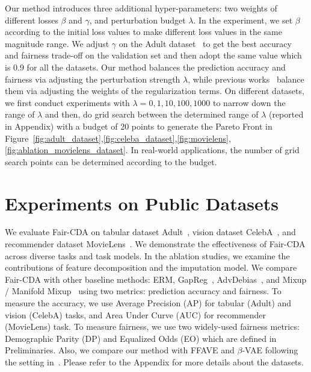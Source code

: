 \documentclass[letterpaper]{article} %
\begin{document}
Our method introduces three additional hyper-parameters: two weights of different losses $\beta$ and $\gamma$, and perturbation budget $\lambda.$ In the experiment, we set $\beta$ according to the initial loss values to make different loss values in the same magnitude range. We adjust $\gamma$ on the Adult dataset~\cite{Dua2017} to get the best accuracy and fairness trade-off on the validation set and then adopt the same value which is 0.9 for all the datasets. Our method balances the prediction accuracy and fairness via adjusting the perturbation strength $\lambda$, while previous works~\cite{chuang2021fair,zhang2018mitigating} balance them via adjusting the weights of the regularization terms. On different datasets, we first conduct experiments with $\lambda=0,1,10,100,1000$ to
narrow down the range of $\lambda$ and then, do grid search between the determined range of $\lambda$ (reported in Appendix) with a budget of 20 points to generate the Pareto Front in Figure~\ref{fig:adult_dataset},\ref{fig:celeba_dataset},\ref{fig:movielens},\ref{fig:ablation_movielens_dataset}. In real-world applications, the number of grid search points can be determined according to the budget.

\section{Experiments on Public Datasets}\label{sec:experiment}

We evaluate Fair-CDA on tabular dataset Adult~\cite{Dua2017}, vision dataset CelebA~\cite{liu2018large}, and recommender dataset MovieLens~\cite{harper2015movielens}. 
We demonstrate the effectiveness of Fair-CDA across diverse tasks and task models. In the ablation studies, we examine the contributions of feature decomposition and
the imputation model.
We compare Fair-CDA with other baseline methods: ERM, GapReg~\cite{chuang2021fair}, AdvDebias~\cite{zhang2018mitigating}, and Mixup / Manifold Mixup~\cite{chuang2021fair} using two metrics: prediction accuracy and fairness. 
To measure the accuracy, we use Average Precision (AP) for tabular (Adult) and vision (CelebA) tasks, and Area Under Curve (AUC) for recommender (MovieLens) task. To measure fairness, we use two widely-used fairness metrics: Demographic Parity (DP) and Equalized Odds (EO) which are defined in Preliminaries. Also, we compare our method with FFAVE and $\beta$-VAE following the setting in~\cite{creager2019flexibly}. Please refer to the Appendix for more details about the datasets.
\end{document}
